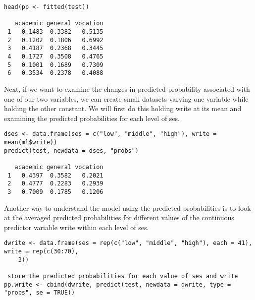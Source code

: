 \begin{frame}[fragile]
\begin{verbatim}
head(pp <- fitted(test))
 
   academic general vocation
 1   0.1483  0.3382   0.5135
 2   0.1202  0.1806   0.6992
 3   0.4187  0.2368   0.3445
 4   0.1727  0.3508   0.4765
 5   0.1001  0.1689   0.7309
 6   0.3534  0.2378   0.4088
\end{verbatim} 
Next, if we want to examine the changes in predicted probability associated with one of our two variables, we can create small datasets varying one 
variable while holding the other constant. We will first do this holding write at its mean and examining the predicted probabilities for each level of ses.
 
\end{frame}
\begin{frame}[fragile]
\begin{verbatim}
dses <- data.frame(ses = c("low", "middle", "high"), write = mean(ml$write))
predict(test, newdata = dses, "probs")
 
   academic general vocation
 1   0.4397  0.3582   0.2021
 2   0.4777  0.2283   0.2939
 3   0.7009  0.1785   0.1206
\end{verbatim}
\end{frame}
\begin{frame}[fragile] 
Another way to understand the model using the predicted probabilities is to look at the averaged predicted probabilities for different values 
of the continuous predictor variable write within each level of ses.
 
\end{frame}
\begin{frame}[fragile]
\begin{verbatim}
dwrite <- data.frame(ses = rep(c("low", "middle", "high"), each = 41), write = rep(c(30:70),
    3))

 store the predicted probabilities for each value of ses and write
pp.write <- cbind(dwrite, predict(test, newdata = dwrite, type = "probs", se = TRUE))
\end{verbatim}
\end{frame}
